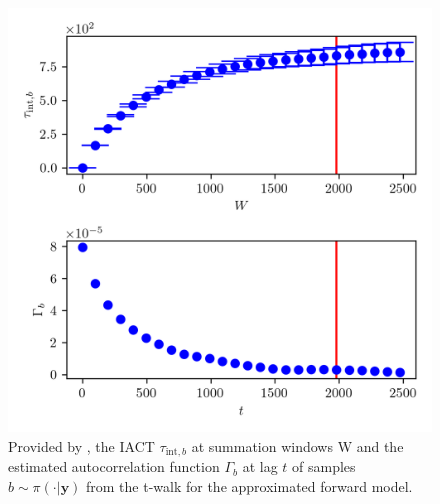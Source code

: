 \begin{figure}[ht!]
	\centering
	\includegraphics{UwerrTauIntTWalk2.png}
	\caption[IACT and autocorrelation function of samples $b \sim \pi(\cdot|\bm{y})$, for approximated model.]{Provided by \cite{drikHesse}, the IACT $\tau_{\text{int},b}$ at summation windows W and the estimated autocorrelation function $\Gamma_{b}$ at lag $t$ of samples $b \sim \pi( \cdot| \bm{y})$ from the t-walk for the approximated forward model.}
	\label{fig:TWalkIATC3}
\end{figure}


